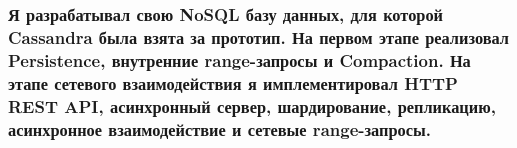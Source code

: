 \documentclass[11pt]{article}
\begin{document}
\subsubsection{Я разрабатывал \textbf{свою NoSQL базу данных}, для которой Cassandra была взята за прототип. На первом этапе реализовал \textbf{Persistence}, \textbf{внутренние range-запросы} и \textbf{Compaction}. На этапе сетевого взаимодействия я имплементировал \textbf{HTTP REST API}, \textbf{асинхронный сервер}, \textbf{шардирование}, \textbf{репликацию}, \textbf{асинхронное взаимодействие} и \textbf{сетевые range-запросы}.}
\begin{itemize}
\end{itemize}
\end{document}
